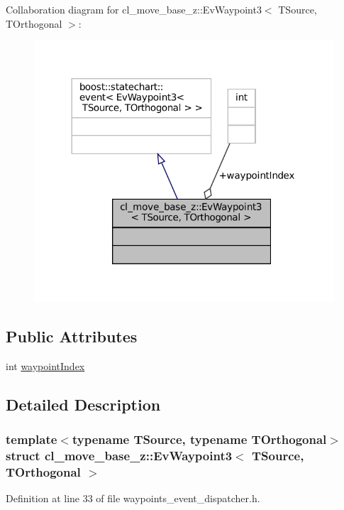 Collaboration diagram for cl\+\_\+move\+\_\+base\+\_\+z\+:\+:Ev\+Waypoint3$<$ T\+Source, T\+Orthogonal $>$\+:
\nopagebreak
\begin{figure}[H]
\begin{center}
\leavevmode
\includegraphics[width=317pt]{structcl__move__base__z_1_1EvWaypoint3__coll__graph}
\end{center}
\end{figure}
\subsection*{Public Attributes}
\begin{DoxyCompactItemize}
\item 
int \hyperlink{structcl__move__base__z_1_1EvWaypoint3_a6db7d0f5861b7adec2d5671e3d2db7af}{waypoint\+Index}
\end{DoxyCompactItemize}


\subsection{Detailed Description}
\subsubsection*{template$<$typename T\+Source, typename T\+Orthogonal$>$\newline
struct cl\+\_\+move\+\_\+base\+\_\+z\+::\+Ev\+Waypoint3$<$ T\+Source, T\+Orthogonal $>$}



Definition at line 33 of file waypoints\+\_\+event\+\_\+dispatcher.\+h.



